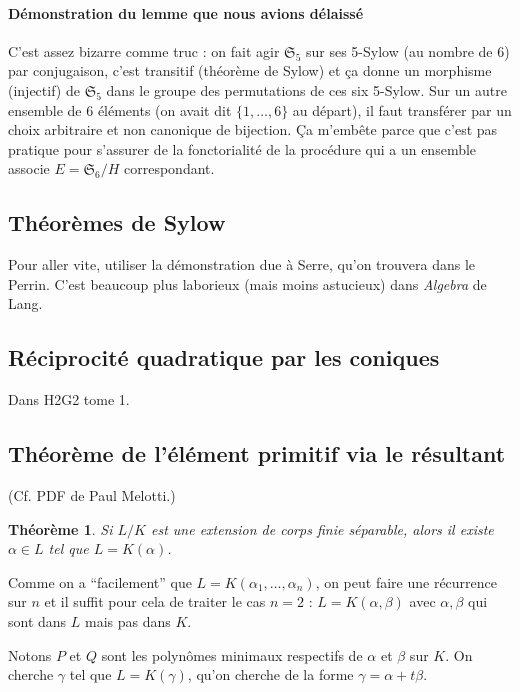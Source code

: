 \documentclass[a4paper, 11pt]{article}
\def\Sigmap{\mathfrak{S}}
\newtheorem*{theorem}{Théorème}
\begin{document}
\paragraph{Démonstration du lemme que nous avions délaissé} C'est assez bizarre
comme truc : on fait agir $\Sigmap_5$ sur ses 5-Sylow (au nombre de 6) par
conjugaison, c'est transitif (théorème de Sylow) et ça donne un morphisme
(injectif) de $\Sigmap_5$ dans le groupe des permutations de ces six 5-Sylow.
Sur un autre ensemble de 6 éléments (on avait dit $\{1,\ldots,6\}$ au départ),
il faut transférer par un choix arbitraire et non canonique de bijection. Ça
m'embête parce que c'est pas pratique pour s'assurer de la fonctorialité de la
procédure qui a un ensemble associe $E = \Sigmap_6/H$ correspondant.


\subsection{Théorèmes de Sylow}

Pour aller vite, utiliser la démonstration due à Serre, qu'on trouvera dans le
Perrin. C'est beaucoup plus laborieux (mais moins astucieux) dans \emph{Algebra}
de Lang.

\subsection{Réciprocité quadratique par les coniques}

Dans H2G2 tome 1.

\subsection{Théorème de l'élément primitif via le résultant}

(Cf. PDF de Paul Melotti.)

\begin{theorem}
  Si $L/K$ est une extension de corps finie séparable, alors il existe $\alpha
  \in L$ tel que $L = K(\alpha)$.
\end{theorem}

Comme on a \enquote{facilement} que $L = K(\alpha_1, \ldots, \alpha_n)$, on peut
faire une récurrence sur $n$ et il suffit pour cela de traiter le cas $n = 2$ :
$L = K(\alpha,\beta)$ avec $\alpha, \beta$ qui sont dans $L$ mais pas dans $K$.

Notons $P$ et $Q$ sont les polynômes minimaux respectifs de $\alpha$ et $\beta$
sur $K$. On cherche $\gamma$ tel que $L = K(\gamma)$, qu'on cherche de la forme
$\gamma = \alpha + t\beta$. 
\end{document}
